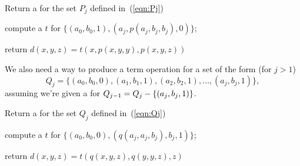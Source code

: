 \LinesNumbered
\begin{algorithm}%

\caption{Return a \ldto for the set $P_j$ defined in~(\ref{eqn:Pj})
\label{alg:ild0}}

compute a \ldto $t$ for $\{(a_0, b_0, 1), (a_j, p(a_j, b_j, b_j), 0)\}$;

return $d(x,y,z) = t(x, p(x,y,y), p(x,y,z))$

\end{algorithm}


We also need a way to produce a \ld
term operation for a set of the form  (for $j>1$)
\begin{equation}
\label{eqn:Qj}
Q_{j} = \{(a_0, b_0, 0), (a_1, b_1, 1), (a_2, b_2, 1), \dots,
(a_{j}, b_{j}, 1)\},
\end{equation}
assuming we're given a \ldto for
$Q_{j-1} = Q_j - \{(a_j, b_j, 1)\}$.

\LinesNumbered
\begin{algorithm}%
  \caption{Return a \ldto for the set $Q_j$ defined in~(\ref{eqn:Qj})
  \label{alg:ild1}}

  compute a \ldto $t$ for $\{(a_0, b_0, 0), (q(a_j, a_j, b_j), b_j, 1)\}$;

  return $d(x,y,z) = t(q(x,y,z), q(y,y,z), z)$
\end{algorithm}

